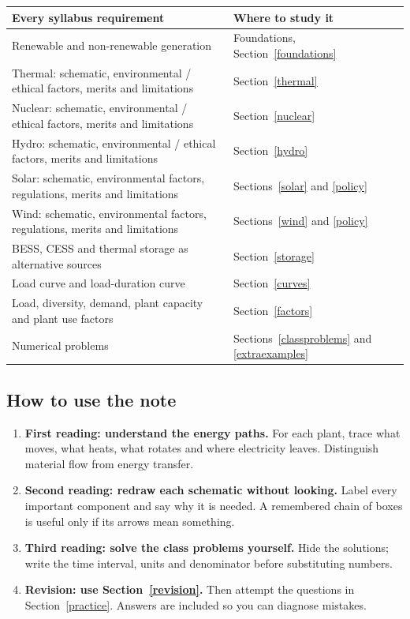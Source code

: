 \documentclass[11pt,a4paper]{article}
\begin{document}
\begin{center}\small
\begin{tabularx}{\textwidth}{L{5.8cm}Y}
\toprule\textbf{Every syllabus requirement} & \textbf{Where to study it}\\\midrule
Renewable and non-renewable generation & Foundations, Section~\ref{foundations}\\
Thermal: schematic, environmental / ethical factors, merits and limitations & Section~\ref{thermal}\\
Nuclear: schematic, environmental / ethical factors, merits and limitations & Section~\ref{nuclear}\\
Hydro: schematic, environmental / ethical factors, merits and limitations & Section~\ref{hydro}\\
Solar: schematic, environmental factors, regulations, merits and limitations & Sections~\ref{solar} and \ref{policy}\\
Wind: schematic, environmental factors, regulations, merits and limitations & Sections~\ref{wind} and \ref{policy}\\
BESS, CESS and thermal storage as alternative sources & Section~\ref{storage}\\
Load curve and load-duration curve & Section~\ref{curves}\\
Load, diversity, demand, plant capacity and plant use factors & Section~\ref{factors}\\
Numerical problems & Sections~\ref{classproblems} and \ref{extraexamples}\\\bottomrule
\end{tabularx}\end{center}

\subsection{How to use the note}
\begin{enumerate}
\item \textbf{First reading: understand the energy paths.} For each plant, trace what moves, what heats, what rotates and where electricity leaves. Distinguish material flow from energy transfer.
\item \textbf{Second reading: redraw each schematic without looking.} Label every important component and say why it is needed. A remembered chain of boxes is useful only if its arrows mean something.
\item \textbf{Third reading: solve the class problems yourself.} Hide the solutions; write the time interval, units and denominator before substituting numbers.
\item \textbf{Revision: use Section~\ref{revision}.} Then attempt the questions in Section~\ref{practice}. Answers are included so you can diagnose mistakes.
\end{enumerate}
\end{document}
